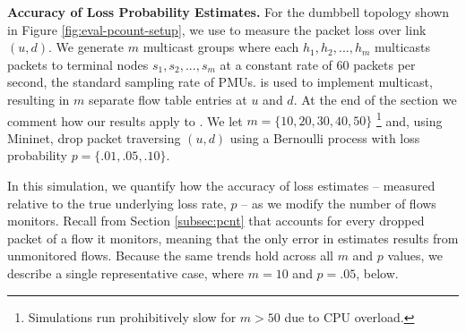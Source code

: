 
{\bf Accuracy of Loss Probability Estimates.}
For the dumbbell topology shown in Figure \ref{fig:eval-pcount-setup}, we use \pcnt to measure the packet loss over link $(u,d)$.  We generate $m$ multicast groups
where each $h_1,h_2, ..., h_m$ multicasts packets to terminal nodes $s_1, s_2, ..., s_m$ at a constant rate of $60$ packets per second, the standard sampling rate of PMUs.  \base is used
to implement multicast, resulting in $m$ separate flow table entries at $u$ and $d$.  At the end of the section we comment how our results apply to \merges. We let $m=\{10,20,30,40,50\}$
\footnote{Simulations run prohibitively slow for $m>50$ due to CPU overload.} %
and, using Mininet, drop packet traversing $(u,d)$ using a Bernoulli process with loss probability $p=\{.01,.05,.10\}$.  

In this simulation, we quantify how the accuracy of \pcnt loss estimates -- measured relative to the true underlying loss rate, $p$ -- as we modify the number of flows \pcnt monitors. 
Recall from Section \ref{subsec:pcnt} that \pcnt accounts for every dropped packet of a flow it monitors, meaning that the only error in \pcnt estimates results from unmonitored flows.
Because the same trends hold across all $m$ and $p$ values, we describe a single representative case, where $m=10$ and $p=.05$, below.


